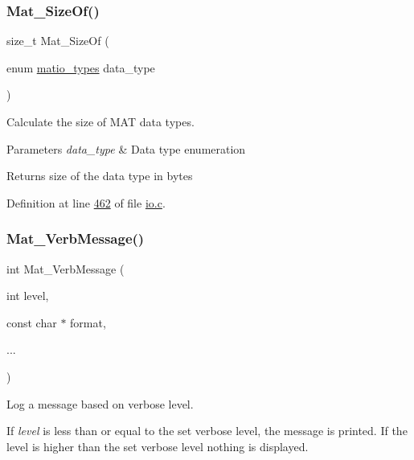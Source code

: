 \subsubsection{\texorpdfstring{Mat\+\_\+\+Size\+Of()}{Mat\_SizeOf()}}
{\footnotesize\ttfamily size\+\_\+t Mat\+\_\+\+Size\+Of (\begin{DoxyParamCaption}\item[{enum \hyperlink{group___m_a_t_gacf7b3b879282b7ab3a51190e49bf3453}{matio\+\_\+types}}]{data\+\_\+type }\end{DoxyParamCaption})}



Calculate the size of M\+AT data types. 


\begin{DoxyParams}{Parameters}
{\em data\+\_\+type} & Data type enumeration \\
\hline
\end{DoxyParams}
\begin{DoxyReturn}{Returns}
size of the data type in bytes 
\end{DoxyReturn}


Definition at line \hyperlink{io_8c_source_l00462}{462} of file \hyperlink{io_8c_source}{io.\+c}.

\mbox{\label{group__mat__util_ga64a176ea7e27e38d4242a24f3e3bad24}} 
\subsubsection{\texorpdfstring{Mat\+\_\+\+Verb\+Message()}{Mat\_VerbMessage()}}
{\footnotesize\ttfamily int Mat\+\_\+\+Verb\+Message (\begin{DoxyParamCaption}\item[{int}]{level,  }\item[{const char $\ast$}]{format,  }\item[{}]{... }\end{DoxyParamCaption})}



Log a message based on verbose level. 

If {\itshape level} is less than or equal to the set verbose level, the message is printed. If the level is higher than the set verbose level nothing is displayed.


